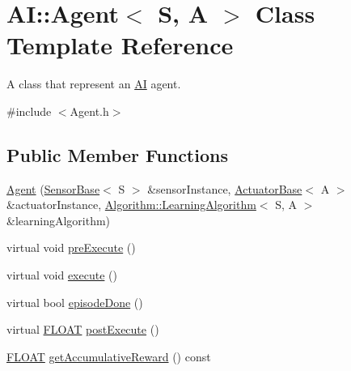 \hypertarget{classAI_1_1Agent}{\section{A\+I\+:\+:Agent$<$ S, A $>$ Class Template Reference}
\label{classAI_1_1Agent}
}


A class that represent an \hyperlink{namespaceAI}{A\+I} agent.  




{\ttfamily \#include $<$Agent.\+h$>$}

\subsection*{Public Member Functions}
\begin{DoxyCompactItemize}
\item 
\hyperlink{classAI_1_1Agent_aee53a91a44c5afa9a7af9113ba9edf2e}{Agent} (\hyperlink{classAI_1_1SensorBase}{Sensor\+Base}$<$ S $>$ \&sensor\+Instance, \hyperlink{classAI_1_1ActuatorBase}{Actuator\+Base}$<$ A $>$ \&actuator\+Instance, \hyperlink{classAI_1_1Algorithm_1_1LearningAlgorithm}{Algorithm\+::\+Learning\+Algorithm}$<$ S, A $>$ \&learning\+Algorithm)
\item 
virtual void \hyperlink{classAI_1_1Agent_a938963e5cbbd862402a4b815b9327093}{pre\+Execute} ()
\item 
virtual void \hyperlink{classAI_1_1Agent_a4c1fa5a86e2baa6510fb1448baff8b83}{execute} ()
\item 
virtual bool \hyperlink{classAI_1_1Agent_a65523b33cc9ca3da9200550ecd0a90e0}{episode\+Done} ()
\item 
virtual \hyperlink{namespaceAI_a41b74884a20833db653dded3918e05c3}{F\+L\+O\+A\+T} \hyperlink{classAI_1_1Agent_ae93d7ac5e75646b0965f18fd9c6a1737}{post\+Execute} ()
\item 
\hyperlink{namespaceAI_a41b74884a20833db653dded3918e05c3}{F\+L\+O\+A\+T} \hyperlink{classAI_1_1Agent_a86266ab330105f0eabda91d9706133de}{get\+Accumulative\+Reward} () const 
\end{DoxyCompactItemize}
